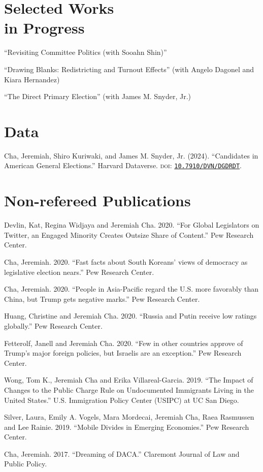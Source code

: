 \documentclass[margin, line]{res}
\begin{document}
\begin{resume}
\section{Selected Works \\in Progress}
\begin{etaremune}
	\item ``Revisiting Committee Politics (with Sooahn Shin)''
	\item ``Drawing Blanks: Redistricting and Turnout Effects'' (with Angelo Dagonel and Kiara Hernandez)
	\item ``The Direct Primary Election'' (with James M. Snyder, Jr.)
\end{etaremune}

\section{Data}
\begin{etaremune}
	\item Cha, Jeremiah, Shiro Kuriwaki, and James M. Snyder, Jr. (2024). ``Candidates in American General Elections.'' Harvard Dataverse. \textsc{doi}: \href{https://doi.org/10.7910/DVN/DGDRDT}{\texttt{10.7910/DVN/DGDRDT}}.
\end{etaremune}

\section{Non-refereed Publications}
\begin{etaremune}
	\item Devlin, Kat, Regina Widjaya and Jeremiah Cha. 2020. ``For Global Legislators on Twitter, an Engaged Minority Creates Outsize Share of Content.'' Pew Research Center.
	\item Cha, Jeremiah. 2020. ``Fast facts about South Koreans’ views of democracy as legislative election nears.'' Pew Research Center.
	\item Cha, Jeremiah. 2020. ``People in Asia-Pacific regard the U.S. more favorably than China, but Trump gets negative marks.'' Pew Research Center.
	\item Huang, Christine and Jeremiah Cha. 2020. ``Russia and Putin receive low ratings globally.'' Pew Research Center.
	\item Fetterolf, Janell and Jeremiah Cha. 2020. ``Few in other countries approve of Trump’s major foreign policies, but Israelis are an exception.'' Pew Research Center.
	\item Wong, Tom K., Jeremiah Cha and Erika Villareal-Garcia. 2019. ``The Impact of Changes to the Public Charge Rule on Undocumented Immigrants Living in the United States.'' U.S. Immigration Policy Center (USIPC) at UC San Diego.
	\item Silver, Laura, Emily A. Vogels, Mara Mordecai, Jeremiah Cha, Raea Rasmussen and Lee Rainie. 2019. ``Mobile Divides in Emerging Economies.'' Pew Research Center.
	\item Cha, Jeremiah. 2017. ``Dreaming of DACA.'' Claremont Journal of Law and Public Policy.
\end{etaremune}



\end{resume}
\end{document}
